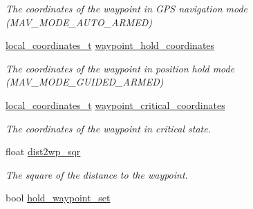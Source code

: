 \begin{DoxyCompactItemize}
\begin{DoxyCompactList}\small\item\em The coordinates of the waypoint in G\+P\+S navigation mode (M\+A\+V\+\_\+\+M\+O\+D\+E\+\_\+\+A\+U\+T\+O\+\_\+\+A\+R\+M\+E\+D) \end{DoxyCompactList}\item 
\hypertarget{structmavlink__waypoint__handler__t_a7bd97360c41c40fc46d9c651629b28b2}{\hyperlink{structlocal__coordinates__t}{local\+\_\+coordinates\+\_\+t} \hyperlink{structmavlink__waypoint__handler__t_a7bd97360c41c40fc46d9c651629b28b2}{waypoint\+\_\+hold\+\_\+coordinates}}\label{structmavlink__waypoint__handler__t_a7bd97360c41c40fc46d9c651629b28b2}

\begin{DoxyCompactList}\small\item\em The coordinates of the waypoint in position hold mode (M\+A\+V\+\_\+\+M\+O\+D\+E\+\_\+\+G\+U\+I\+D\+E\+D\+\_\+\+A\+R\+M\+E\+D) \end{DoxyCompactList}\item 
\hypertarget{structmavlink__waypoint__handler__t_a56476281020bb180ee451c4f3e617e73}{\hyperlink{structlocal__coordinates__t}{local\+\_\+coordinates\+\_\+t} \hyperlink{structmavlink__waypoint__handler__t_a56476281020bb180ee451c4f3e617e73}{waypoint\+\_\+critical\+\_\+coordinates}}\label{structmavlink__waypoint__handler__t_a56476281020bb180ee451c4f3e617e73}

\begin{DoxyCompactList}\small\item\em The coordinates of the waypoint in critical state. \end{DoxyCompactList}\item 
\hypertarget{structmavlink__waypoint__handler__t_a13011cc2850c2d498aed37e0eb514416}{float \hyperlink{structmavlink__waypoint__handler__t_a13011cc2850c2d498aed37e0eb514416}{dist2wp\+\_\+sqr}}\label{structmavlink__waypoint__handler__t_a13011cc2850c2d498aed37e0eb514416}

\begin{DoxyCompactList}\small\item\em The square of the distance to the waypoint. \end{DoxyCompactList}\item 
\hypertarget{structmavlink__waypoint__handler__t_aaa15ebced5c311683ed8fa9ef7ffdea2}{bool \hyperlink{structmavlink__waypoint__handler__t_aaa15ebced5c311683ed8fa9ef7ffdea2}{hold\+\_\+waypoint\+\_\+set}}\label{structmavlink__waypoint__handler__t_aaa15ebced5c311683ed8fa9ef7ffdea2}


\end{DoxyCompactItemize}
